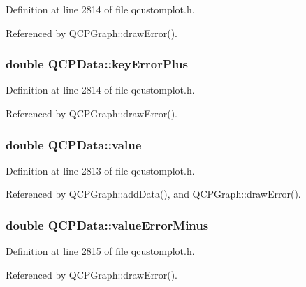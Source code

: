 Definition at line 2814 of file qcustomplot.\+h.



Referenced by Q\+C\+P\+Graph\+::draw\+Error().

\hypertarget{class_q_c_p_data_ae468c3808107c2fd23052481156ab5b5}{}
\subsubsection[{key\+Error\+Plus}]{\setlength{\rightskip}{0pt plus 5cm}double Q\+C\+P\+Data\+::key\+Error\+Plus}\label{class_q_c_p_data_ae468c3808107c2fd23052481156ab5b5}


Definition at line 2814 of file qcustomplot.\+h.



Referenced by Q\+C\+P\+Graph\+::draw\+Error().

\hypertarget{class_q_c_p_data_aefe1ecf8fa2e34ed875b67523e542373}{}
\subsubsection[{value}]{\setlength{\rightskip}{0pt plus 5cm}double Q\+C\+P\+Data\+::value}\label{class_q_c_p_data_aefe1ecf8fa2e34ed875b67523e542373}


Definition at line 2813 of file qcustomplot.\+h.



Referenced by Q\+C\+P\+Graph\+::add\+Data(), and Q\+C\+P\+Graph\+::draw\+Error().

\hypertarget{class_q_c_p_data_a51d8f42bf4d49a1f263531e70cadd6a3}{}
\subsubsection[{value\+Error\+Minus}]{\setlength{\rightskip}{0pt plus 5cm}double Q\+C\+P\+Data\+::value\+Error\+Minus}\label{class_q_c_p_data_a51d8f42bf4d49a1f263531e70cadd6a3}


Definition at line 2815 of file qcustomplot.\+h.



Referenced by Q\+C\+P\+Graph\+::draw\+Error().

